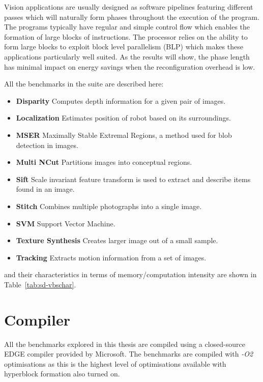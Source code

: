 Vision applications are usually designed as software pipelines featuring different passes which will naturally form phases throughout the execution of the program.
The programs typically have regular and simple control flow which enables the formation of large blocks of instructions.
The processor relies on the ability to form large blocks to exploit block level parallelism (BLP) which makes these applications particularly well suited.
As the results will show, the phase length has minimal impact on energy savings when the reconfiguration overhead is low.

All the benchmarks in the suite are described here:
\begin{itemize}
\item \textbf{Disparity} Computes depth information for a given pair of images.
\vspace{-1em}
\item \textbf{Localization} Estimates position of robot based on its surroundings.
\vspace{-1em}
\item \textbf{MSER} Maximally Stable Extremal Regions, a method used for blob detection in images.
\vspace{-1em}
\item \textbf{Multi NCut} Partitions images into conceptual regions.
\vspace{-1em}
\item \textbf{Sift} Scale invariant feature transform is used to extract and describe items found in an image.
\vspace{-1em}
\item \textbf{Stitch} Combines multiple photographs into a single image.
\vspace{-1em}
\item \textbf{SVM} Support Vector Machine.
\vspace{-1em}
\item \textbf{Texture Synthesis} Creates larger image out of a small sample.
\vspace{-1em}
\item \textbf{Tracking} Extracts motion information from a set of images.
\end{itemize}

and their characteristics in terms of memory/computation intensity are shown in Table~\ref{tab:sd-vbschar}.
\section{Compiler}\label{chp:setup:comp}

All the benchmarks explored in this thesis are compiled using a closed-source EDGE compiler provided by Microsoft.
The benchmarks are compiled with \textit{-O2} optimisations as this is the highest level of optimisations available with hyperblock formation also turned on.
